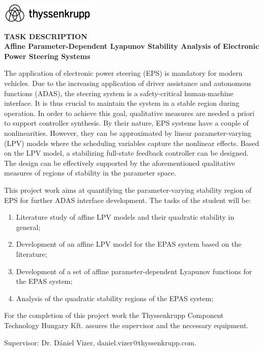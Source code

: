 \clearpage

\begin{flushright}
\includegraphics[width=45mm,keepaspectratio]{figures/tk_logo.png} \\[1cm] \end{flushright}

\begin{center}
\large
\textbf{TASK DESCRIPTION}\\[0.4cm]

\textbf{Affine Parameter-Dependent Lyapunov Stability Analysis of Electronic Power Steering Systems} \\
\end{center}

The application of electronic power steering (EPS) is mandatory for modern vehicles. Due to the increasing application of driver assistance and autonomous functions (ADAS), the steering system is a safety-critical human-machine interface. It is thus crucial to maintain the system in a stable region during operation. In order to achieve this goal, qualitative measures are needed a priori to support controller synthesis. By their nature, EPS systems have a couple of nonlinearities. However, they can be approximated by linear parameter-varying (LPV) models where the scheduling variables capture the nonlinear effects. Based on the LPV model, a stabilizing full-state feedback controller can be designed. The design can be effectively supported by the aforementioned qualitative measures of regions of stability in the parameter space.

This project work aims at quantifying the parameter-varying stability region of EPS for further ADAS interface development. The tasks of the student will be:
\begin{enumerate}
	\item Literature study of affine LPV models and their quadratic stability in general;
	\item Development of an affine LPV model for the EPAS system based on the literature;
	\item Development of a set of affine parameter-dependent Lyapunov functions for the EPAS system;
	\item Analysis of the quadratic stability regions of the EPAS system; 
\end{enumerate}

For the completion of this project work the Thyssenkrupp Component Technology Hungary Kft. assures the supervisor and the necessary equipment.

Supervisor: Dr. Dániel Vizer,  daniel.vizer@thyssenkrupp.com.